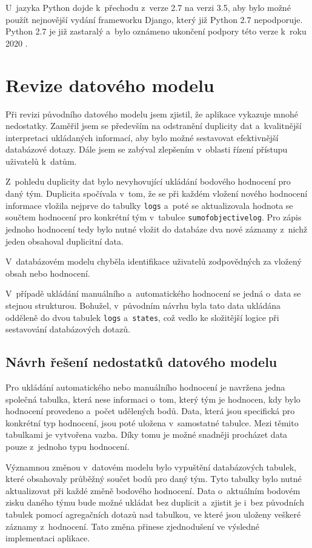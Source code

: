 \documentclass[
  digital,
  twoside,
  table, 
  nolof, 
  nolot
]{fithesis3}
\begin{document}
U~jazyka Python dojde k~přechodu z~verze 2.7 na verzi 3.5, aby bylo možné použít nejnovější vydání frameworku Django, který již Python 2.7 nepodporuje. Python 2.7 je již zastaralý a~bylo oznámeno ukončení podpory této verze k~roku 2020 \cite{python27}.


\section{Revize datového modelu}

Při revizi původního datového modelu jsem zjistil, že aplikace vykazuje mnohé nedostatky. Zaměřil jsem se především na odstranění duplicity dat a~kvalitnější interpretaci ukládaných informací, aby bylo možné sestavovat efektivnější databázové dotazy. Dále jsem se zabýval zlepšením v~oblasti řízení přístupu uživatelů k~datům.

Z~pohledu duplicity dat bylo nevyhovující ukládání bodového hodnocení pro daný tým. Duplicita spočívala v~tom, že se při každém vložení nového hodnocení informace vložila nejprve do tabulky \texttt{logs} a~poté se aktualizovala hodnota se součtem hodnocení pro konkrétní tým v~tabulce \texttt{sumofobjectivelog}. Pro zápis jednoho hodnocení tedy bylo nutné vložit do databáze dva nové záznamy z~nichž jeden obsahoval duplicitní data.

V~databázovém modelu chyběla identifikace uživatelů zodpovědných za vložený obsah nebo hodnocení. 

V~případě ukládání manuálního a~automatického hodnocení se jedná o~data se stejnou strukturou. Bohužel, v~původním návrhu byla tato data ukládána odděleně do dvou tabulek \texttt{logs} a~\texttt{states}, což vedlo ke složitější logice při sestavování databázových dotazů.

\subsection{Návrh řešení nedostatků datového modelu}
Pro ukládání automatického nebo manuálního hodnocení je navržena jedna společná tabulka, která nese informaci o~tom, který tým je hodnocen, kdy bylo hodnocení provedeno a~počet udělených bodů. Data, která jsou specifická pro konkrétní typ hodnocení, jsou poté uložena v~samostatné tabulce. Mezi těmito tabulkami je vytvořena vazba. Díky tomu je možné snadněji procházet data pouze z~jednoho typu hodnocení.

Významnou změnou v~datovém modelu bylo vypuštění databázových tabulek, které obsahovaly průběžný součet bodů pro daný tým. Tyto tabulky bylo nutné aktualizovat při každé změně bodového hodnocení. Data o~aktuálním bodovém zisku daného týmu bude možné ukládat bez duplicit a~zjistit je i~bez původních tabulek pomocí agregačních dotazů nad tabulkou, ve které jsou uloženy veškeré záznamy z~hodnocení. Tato změna přinese zjednodušení ve výsledné implementaci aplikace.
\end{document}

